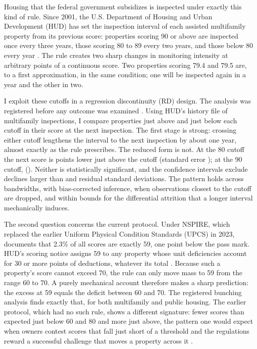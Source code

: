 \documentclass[11pt,letterpaper]{article}
\begin{document}
Housing that the federal government subsidizes is inspected under exactly this kind of rule. Since 2001, the U.S. Department of Housing and Urban Development (HUD) has set the inspection interval of each assisted multifamily property from its previous score: properties scoring 90 or above are inspected once every three years, those scoring 80 to 89 every two years, and those below 80 every year \citep{fr2000}. The rule creates two sharp changes in monitoring intensity at arbitrary points of a continuous score. Two properties scoring 79.4 and 79.5 are, to a first approximation, in the same condition; one will be inspected again in a year and the other in two.

I exploit these cutoffs in a regression discontinuity (RD) design. The analysis was registered before any outcome was examined \citep{osfplan}. Using HUD's history file of multifamily inspections, I compare properties just above and just below each cutoff in their score at the next inspection. The first stage is strong: crossing either cutoff lengthens the interval to the next inspection by about one year, almost exactly as the rule prescribes. The reduced form is not. At the 80 cutoff the next score is \jumpEighty{} points lower just above the cutoff (standard error \seEighty); at the 90 cutoff, \jumpNinety{} (\seNinety). Neither is statistically significant, and the confidence intervals exclude declines larger than \ciLoSdEighty{} and \ciLoSdNinety{} residual standard deviations. The pattern holds across bandwidths, with bias-corrected inference, when observations closest to the cutoff are dropped, and within bounds for the differential attrition that a longer interval mechanically induces.

The second question concerns the current protocol. Under NSPIRE, which replaced the earlier Uniform Physical Condition Standards (UPCS) in 2023, \citet{ameen2026} documents that 2.3\% of all scores are exactly 59, one point below the pass mark. HUD's scoring notice assigns 59 to any property whose unit deficiencies account for 30 or more points of deductions, whatever its total \citep{nspirescoring}. Because such a property's score cannot exceed 70, the rule can only move mass to 59 from the range 60 to 70. A purely mechanical account therefore makes a sharp prediction: the excess at 59 equals the deficit between 60 and 70. The registered bunching analysis finds exactly that, for both multifamily and public housing. The earlier protocol, which had no such rule, shows a different signature: fewer scores than expected just below 60 and 80 and more just above, the pattern one would expect when owners contest scores that fall just short of a threshold and the regulations reward a successful challenge that moves a property across it \citep{fr2000}.
\end{document}
